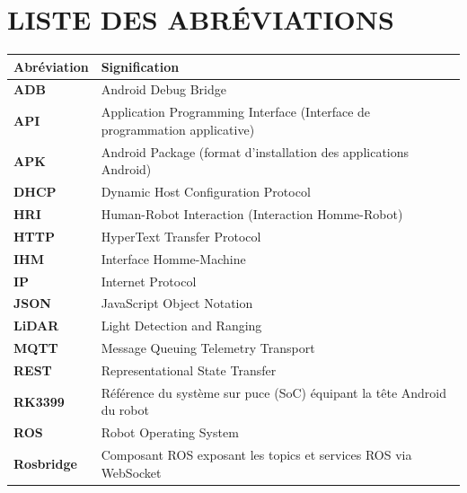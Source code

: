 \newpage
\section*{\centering LISTE DES ABRÉVIATIONS}

\renewcommand{\arraystretch}{1.15}

\begin{center}
\begin{tabularx}{\textwidth}{>{\bfseries}p{3cm}X}
\toprule
Abréviation & Signification \\
\midrule

ADB & Android Debug Bridge \\

API & Application Programming Interface (Interface de programmation applicative) \\

APK & Android Package (format d'installation des applications Android) \\

DHCP & Dynamic Host Configuration Protocol \\

HRI & Human-Robot Interaction (Interaction Homme-Robot) \\

HTTP & HyperText Transfer Protocol \\

IHM & Interface Homme-Machine \\

IP & Internet Protocol \\

JSON & JavaScript Object Notation \\

LiDAR & Light Detection and Ranging \\

MQTT & Message Queuing Telemetry Transport \\

REST & Representational State Transfer \\

RK3399 & Référence du système sur puce (SoC) équipant la tête Android du robot \\

ROS & Robot Operating System \\

Rosbridge & Composant ROS exposant les topics et services ROS via WebSocket \\


\end{tabularx}
\end{center}
